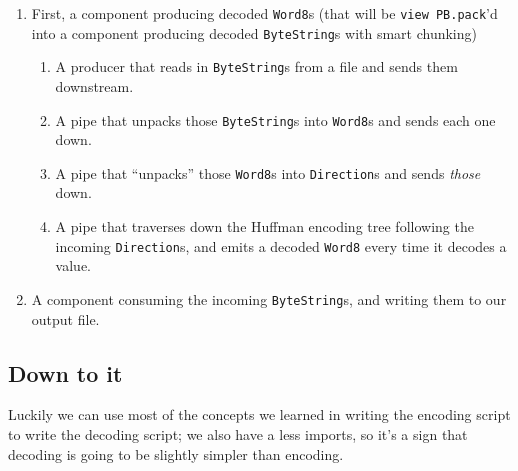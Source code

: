 \documentclass[]{article}
\begin{document}
\begin{enumerate}
\def\labelenumi{\arabic{enumi}.}
\tightlist
\item
  First, a component producing decoded \texttt{Word8}s (that will be
  \texttt{view\ PB.pack}'d into a component producing decoded
  \texttt{ByteString}s with smart chunking)

  \begin{enumerate}
  \def\labelenumii{\arabic{enumii}.}
  \tightlist
  \item
    A producer that reads in \texttt{ByteString}s from a file and sends them
    downstream.
  \item
    A pipe that unpacks those \texttt{ByteString}s into \texttt{Word8}s and
    sends each one down.
  \item
    A pipe that ``unpacks'' those \texttt{Word8}s into \texttt{Direction}s and
    sends \emph{those} down.
  \item
    A pipe that traverses down the Huffman encoding tree following the incoming
    \texttt{Direction}s, and emits a decoded \texttt{Word8} every time it
    decodes a value.
  \end{enumerate}
\item
  A component consuming the incoming \texttt{ByteString}s, and writing them to
  our output file.
\end{enumerate}

\hypertarget{down-to-it-1}{%
\subsection{Down to it}\label{down-to-it-1}}

Luckily we can use most of the concepts we learned in writing the encoding
script to write the decoding script; we also have a less imports, so it's a sign
that decoding is going to be slightly simpler than encoding.
\end{document}

